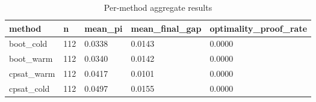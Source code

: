 \begin{table}[t]
\centering
\begin{tabular}{lllll}
\toprule
method & n & mean\_pi & mean\_final\_gap & optimality\_proof\_rate \\
\midrule
boot\_cold & 112 & 0.0338 & 0.0143 & 0.0000 \\
boot\_warm & 112 & 0.0340 & 0.0142 & 0.0000 \\
cpsat\_warm & 112 & 0.0417 & 0.0101 & 0.0000 \\
cpsat\_cold & 112 & 0.0497 & 0.0155 & 0.0000 \\
\bottomrule
\end{tabular}
\caption{Per-method aggregate results}
\label{tab:main-jssp}
\end{table}

